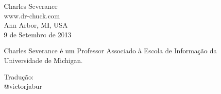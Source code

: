 Charles Severance\\
www.dr-chuck.com\\
Ann Arbor, MI, USA\\
9 de Setembro de 2013


Charles Severance é um Professor Associado à Escola de Informação da
Universidade de Michigan.


Tradução:\\
@victorjabur

\clearemptydoublepage

\begin{latexonly}

\tableofcontents

\clearemptydoublepage

\end{latexonly}

\mainmatter

